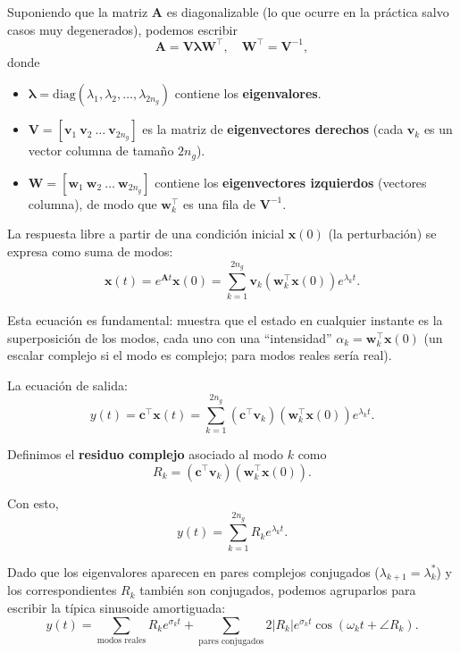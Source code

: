 
Suponiendo que la matriz $\mathbf{A}$ es diagonalizable (lo que ocurre en la práctica salvo casos muy degenerados), podemos escribir
\[
\mathbf{A} = \mathbf{V} \mathbf{\lambda} \mathbf{W}^\top, \quad \mathbf{W}^\top = \mathbf{V}^{-1},
\]
donde
\begin{itemize}
    \item $\mathbf{\lambda} = \text{diag}(\lambda_1, \lambda_2, \dots, \lambda_{2n_g})$ contiene los \textbf{eigenvalores}.
    \item $\mathbf{V} = [ \mathbf{v}_1 \ \mathbf{v}_2 \ \dots \ \mathbf{v}_{2n_g} ]$ es la matriz de \textbf{eigenvectores derechos} (cada $\mathbf{v}_k$ es un vector columna de tamaño $2n_g$).
    \item $\mathbf{W} = [ \mathbf{w}_1 \ \mathbf{w}_2 \ \dots \ \mathbf{w}_{2n_g} ]$ contiene los \textbf{eigenvectores izquierdos} (vectores columna), de modo que $\mathbf{w}_k^\top$ es una fila de $\mathbf{V}^{-1}$.
\end{itemize}

La respuesta libre a partir de una condición inicial $\mathbf{x}(0)$ (la perturbación) se expresa como suma de modos:
\begin{equation}
\mathbf{x}(t) = e^{\mathbf{A}t}\mathbf{x}(0) = \sum_{k=1}^{2n_g} \mathbf{v}_k \left( \mathbf{w}_k^\top \mathbf{x}(0) \right) e^{\lambda_k t}.
\end{equation}

Esta ecuación es fundamental: muestra que el estado en cualquier instante es la superposición de los modos, cada uno con una ``intensidad'' $\alpha_k = \mathbf{w}_k^\top \mathbf{x}(0)$ (un escalar complejo si el modo es complejo; para modos reales sería real).

La ecuación de salida:
\[
y(t) = \mathbf{c}^\top \mathbf{x}(t) = \sum_{k=1}^{2n_g} \left( \mathbf{c}^\top \mathbf{v}_k \right) \left( \mathbf{w}_k^\top \mathbf{x}(0) \right) e^{\lambda_k t}.
\]

Definimos el \textbf{residuo complejo} asociado al modo $k$ como
\begin{equation}
\boxed{R_k = \left( \mathbf{c}^\top \mathbf{v}_k \right) \left( \mathbf{w}_k^\top \mathbf{x}(0) \right)}.
\end{equation}

Con esto,
\[
y(t) = \sum_{k=1}^{2n_g} R_k e^{\lambda_k t}.
\]

    Dado que los eigenvalores aparecen en pares complejos conjugados ($\lambda_{k+1} = \lambda_k^*$) y los correspondientes $R_k$ también son conjugados, podemos agruparlos para escribir la típica sinusoide amortiguada:
\[
y(t) = \sum_{\text{modos reales}} R_k e^{\sigma_k t} + \sum_{\text{pares conjugados}} 2 |R_k| e^{\sigma_k t} \cos(\omega_k t + \angle R_k).
\]

